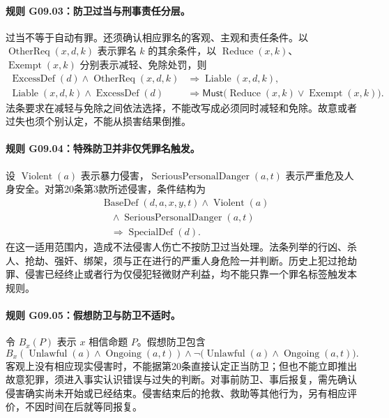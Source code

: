 \paragraph{规则 G09.03：防卫过当与刑事责任分层。}
过当不等于自动有罪。还须确认相应罪名的客观、主观和责任条件。以 $\operatorname{OtherReq}(x,d,k)$ 表示罪名 $k$ 的其余条件，以 $\operatorname{Reduce}(x,k)$、$\operatorname{Exempt}(x,k)$ 分别表示减轻、免除处罚，则
\[
\begin{aligned}
\operatorname{ExcessDef}(d)\land\operatorname{OtherReq}(x,d,k)
&\Longrightarrow\operatorname{Liable}(x,d,k),\\
\operatorname{Liable}(x,d,k)\land\operatorname{ExcessDef}(d)
&\Longrightarrow\mathsf{Must}\bigl(\operatorname{Reduce}(x,k)
\lor\operatorname{Exempt}(x,k)\bigr).
\end{aligned}
\]
法条要求在减轻与免除之间依法选择，不能改写成必须同时减轻和免除。故意或者过失也须个别认定，不能从损害结果倒推。

\paragraph{规则 G09.04：特殊防卫并非仅凭罪名触发。}
\mbox{}\par
设 $\operatorname{Violent}(a)$ 表示暴力侵害，$\operatorname{SeriousPersonalDanger}(a,t)$ 表示严重危及人身安全。对第20条第3款所述侵害，条件结构为
\[
\begin{aligned}
&\operatorname{BaseDef}(d,a,x,y,t)\land\operatorname{Violent}(a)\\
&\quad\land\operatorname{SeriousPersonalDanger}(a,t)\\
&\quad\Longrightarrow\operatorname{SpecialDef}(d).
\end{aligned}
\]
在这一适用范围内，造成不法侵害人伤亡不按防卫过当处理。法条列举的行凶、杀人、抢劫、强奸、绑架，须与正在进行的严重人身危险一并判断。历史上犯过抢劫罪、侵害已经终止或者行为仅侵犯轻微财产利益，均不能只靠一个罪名标签触发本规则。

\paragraph{规则 G09.05：假想防卫与防卫不适时。}
令 $B_x(P)$ 表示 $x$ 相信命题 $P$。假想防卫包含
\[
B_x(\operatorname{Unlawful}(a)\land\operatorname{Ongoing}(a,t))
\land\neg\bigl(\operatorname{Unlawful}(a)\land\operatorname{Ongoing}(a,t)\bigr).
\]
客观上没有相应现实侵害时，不能据第20条直接认定正当防卫；但也不能立即推出故意犯罪，须进入事实认识错误与过失的判断。对事前防卫、事后报复，需先确认侵害确实尚未开始或已经结束。侵害结束后的抢救、救助等其他行为，另有相应评价，不因时间在后就等同报复。


